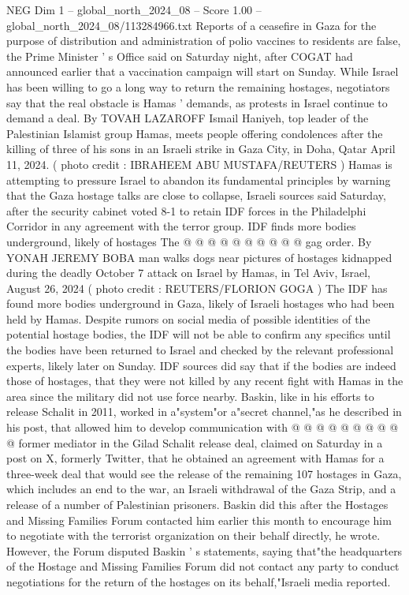 \begin{textsample}{NEG Dim 1 – global\_north\_2024\_08 – Score 1.00 – global\_north\_2024\_08/113284966.txt}  \label{ex:f1_neg_382}
Reports of a ceasefire in Gaza for the purpose of distribution and administration of polio vaccines to residents are false, the Prime Minister ' s Office said on Saturday night, after COGAT had announced earlier that a vaccination campaign will start on Sunday.
While Israel has been willing to go a long way to return the remaining hostages, negotiators say that the real obstacle is Hamas ' demands, as protests in Israel continue to demand a deal.
By TOVAH LAZAROFF Ismail Haniyeh, top leader of the Palestinian Islamist group Hamas, meets people offering condolences after the killing of three of his sons in an Israeli strike in Gaza City, in Doha, Qatar April 11, 2024. ( photo credit : IBRAHEEM ABU MUSTAFA/REUTERS ) Hamas is attempting to pressure Israel to abandon its fundamental principles by warning that the Gaza hostage talks are close to collapse, Israeli sources said Saturday, after the security cabinet voted 8-1 to retain IDF forces in the Philadelphi Corridor in any agreement with the terror group.
IDF finds more bodies underground, likely of hostages The @ @ @ @ @ @ @ @ @ @ gag order.
By YONAH JEREMY BOBA man walks dogs near pictures of hostages kidnapped during the deadly October 7 attack on Israel by Hamas, in Tel Aviv, Israel, August 26, 2024 ( photo credit : REUTERS/FLORION GOGA ) The IDF has found more bodies underground in Gaza, likely of Israeli hostages who had been held by Hamas.
Despite rumors on social media of possible identities of the potential hostage bodies, the IDF will not be able to confirm any specifics until the bodies have been returned to Israel and checked by the relevant professional experts, likely later on Sunday.
IDF sources did say that if the bodies are indeed those of hostages, that they were not killed by any recent fight with Hamas in the area since the military did not use force nearby.
Baskin, like in his efforts to release Schalit in 2011, worked in a"system"or a"secret channel,"as he described in his post, that allowed him to develop communication with @ @ @ @ @ @ @ @ @ @ former mediator in the Gilad Schalit release deal, claimed on Saturday in a post on X, formerly Twitter, that he obtained an agreement with Hamas for a three-week deal that would see the release of the remaining 107 hostages in Gaza, which includes an end to the war, an Israeli withdrawal of the Gaza Strip, and a release of a number of Palestinian prisoners.
Baskin did this after the Hostages and Missing Families Forum contacted him earlier this month to encourage him to negotiate with the terrorist organization on their behalf directly, he wrote.
However, the Forum disputed Baskin ' s statements, saying that"the headquarters of the Hostage and Missing Families Forum did not contact any party to conduct negotiations for the return of the hostages on its behalf,"Israeli media reported.

\end{textsample}
